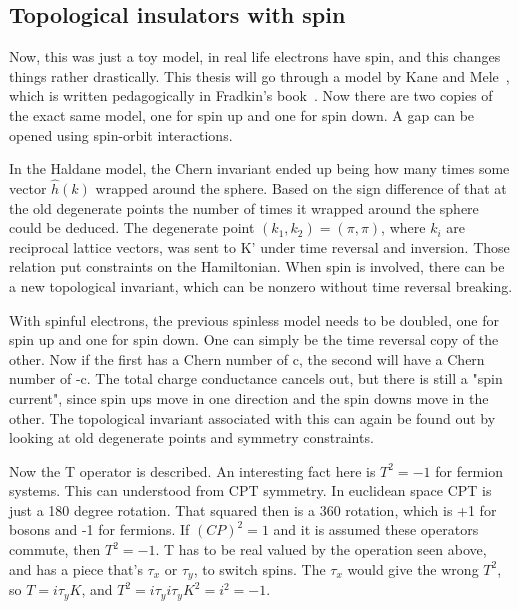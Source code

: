 \subsection{Topological insulators with spin}

Now, this was just a toy model, in real life electrons have spin, and this changes things rather drastically. This thesis will go through a model by Kane and Mele~\cite{KaneMele2D1,KaneMele2D2}, which is written pedagogically in Fradkin's book~\cite{Fradkinbook}. Now there are two copies of the exact same model, one for spin up and one for spin down. A gap can be opened using spin-orbit interactions.

In the Haldane model, the Chern invariant ended up being how many times some vector $\hat{h}(k)$ wrapped around the sphere. Based on the sign difference of that at the old degenerate points the number of times it wrapped around the sphere could be deduced. The degenerate point $(k_1,k_2)=(\pi,\pi)$, where $k_i$ are reciprocal lattice vectors, was sent to K' under time reversal and inversion. Those relation put constraints on the Hamiltonian. When spin is involved, there can be a new topological invariant, which can be nonzero without time reversal breaking. 

With spinful electrons, the previous spinless model needs to be doubled, one for spin up and one for spin down. One can simply be the time reversal copy of the other. Now if the first has a Chern number of c, the second will have a Chern number of -c. The total charge conductance cancels out, but there is still a "spin current", since spin ups move in one direction and the spin downs move in the other. The topological invariant associated with this can again be found out by looking at old degenerate points and symmetry constraints.

Now the T operator is described. An interesting fact here is $T^2 =-1 $ for fermion systems. This can understood from CPT symmetry. In euclidean space CPT is just a 180 degree rotation. That squared then is a 360 rotation, which is +1 for bosons and -1 for fermions. If $(CP)^2=1$ and it is assumed these operators commute, then $T^2=-1$. T has to be real valued by the operation seen above, and has a piece that's $\tau_x$ or $\tau_y$, to switch spins. The $\tau_x$ would give the wrong $T^2$, so $T = i\tau_yK$, and $T^2 = i\tau_yi\tau_yK^2 = i^2 = -1$.

